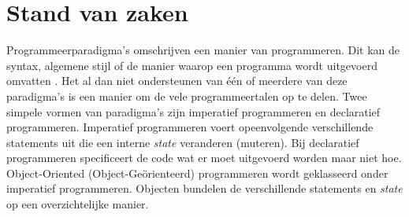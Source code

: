 \chapter{Stand van zaken}
\label{ch:stand-van-zaken}






Programmeerparadigma's omschrijven een manier van programmeren. Dit kan de syntax, algemene stijl of de manier waarop een programma wordt uitgevoerd omvatten \autocite{VanRoy2004}. Het al dan niet ondersteunen van één of meerdere van deze paradigma's is een manier om de vele programmeertalen op te delen. Twee simpele vormen van paradigma's zijn imperatief programmeren en declaratief programmeren. Imperatief programmeren voert opeenvolgende verschillende statements uit die een interne \textit{state} veranderen (muteren). Bij declaratief programmeren specificeert de code wat er moet uitgevoerd worden maar niet hoe. Object-Oriented (Object-Geörienteerd) programmeren wordt geklasseerd onder imperatief programmeren. Objecten bundelen de verschillende statements en \textit{state} op een overzichtelijke manier.

